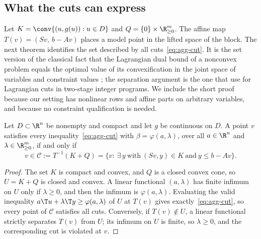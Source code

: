 \subsection{What the cuts can express}\label{sec:closure}

Let $K=\conv\{(u,g(u)):u\in D\}$ and $Q=\{0\}\times\R^m_{\ge0}$. The affine
map $T(v)=(Sv,\ b-Av)$ places a model point in the lifted space of the block.
The next theorem identifies the set described by all cuts~\eqref{eq:agg-cut}.
It is the set version of the classical fact that the Lagrangian dual bound of
a nonconvex problem equals the optimal value of its convexification in the
joint space of variables and constraint values
\citep{Falk1969,Geoffrion1974,FeltenmarkKiwiel2000,LemarechalRenaud2001}; the
separation argument is the one that \citet[Theorem~3]{ChenLuedtke2022} use
for Lagrangian cuts in two-stage integer programs. We include the short proof
because our setting has nonlinear rows and affine parts on arbitrary
variables, and because no constraint qualification is needed.

\begin{theorem}\label{thm:closure}
Let $D\subset\R^n$ be nonempty and compact and let $g$ be continuous on $D$.
A point $v$ satisfies every inequality~\eqref{eq:agg-cut} with
$\beta=\varphi(a,\lambda)$, over all $a\in\R^n$ and $\lambda\in\R^m_{\ge0}$, if
and only if
\begin{equation}\label{eq:closure}
v\in\mathcal C:=T^{-1}(K+Q)=\bigl\{v:\ \exists\,y\ \text{with}\ (Sv,y)\in K\ \text{and}\ y\le b-Av\bigr\}.
\end{equation}
\end{theorem}

\begin{proof}
The set $K$ is compact and convex, and $Q$ is a closed convex cone, so
$U=K+Q$ is closed and convex. A linear functional $(a,\lambda)$ has finite
infimum on $U$ only if $\lambda\ge0$, and then the infimum is
$\varphi(a,\lambda)$. Evaluating the valid inequality
$a\T u+\lambda\T y\ge\varphi(a,\lambda)$ of $U$ at $T(v)$ gives
exactly~\eqref{eq:agg-cut}, so every point of $\mathcal C$ satisfies all cuts.
Conversely, if $T(v)\notin U$, a linear functional strictly separates $T(v)$
from $U$; its infimum on $U$ is finite, so $\lambda\ge0$, and the
corresponding cut is violated at $v$.
\end{proof}

